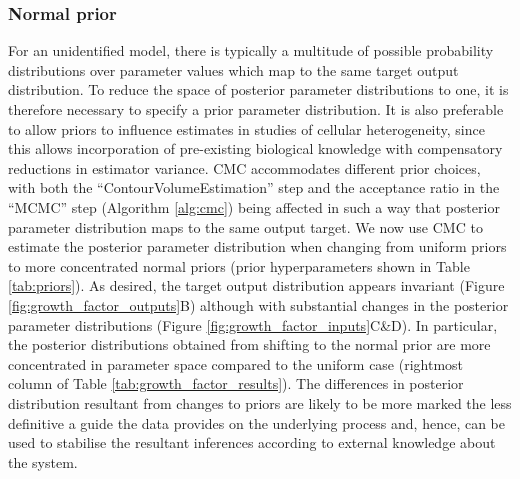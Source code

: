 \subsubsection{Normal prior}
For an unidentified model, there is typically a multitude of possible probability distributions over parameter values which map to the same target output distribution. To reduce the space of posterior parameter distributions to one, it is therefore necessary to specify a prior parameter distribution. It is also preferable to allow priors to influence estimates in studies of cellular heterogeneity, since this allows incorporation of pre-existing biological knowledge with compensatory reductions in estimator variance. CMC accommodates different prior choices, with both the ``ContourVolumeEstimation'' step and the acceptance ratio in the ``MCMC'' step (Algorithm \ref{alg:cmc}) being affected in such a way that posterior parameter distribution maps to the same output target. We now use CMC to estimate the posterior parameter distribution when changing from uniform priors to more concentrated normal priors (prior hyperparameters shown in Table \ref{tab:priors}). As desired, the target output distribution appears invariant (Figure \ref{fig:growth_factor_outputs}B) although with substantial changes in the posterior parameter distributions (Figure \ref{fig:growth_factor_inputs}C\&D). In particular, the posterior distributions obtained from shifting to the normal prior are more concentrated in parameter space compared to the uniform case (rightmost column of Table \ref{tab:growth_factor_results}). The differences in posterior distribution resultant from changes to priors are likely to be more marked the less definitive a guide the data provides on the underlying process and, hence, can be used to stabilise the resultant inferences according to external knowledge about the system.

